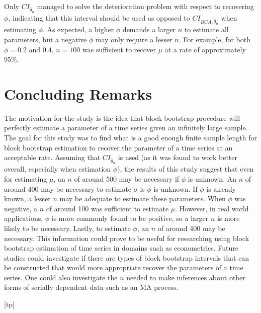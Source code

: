\documentclass[12pt, letterpaper, titlepage]{article}
\begin{document}
Only $CI_{\hat{\theta}_{n}}$ managed to solve the deterioration problem with respect to recovering $\phi$, indicating that this interval 
should be used as opposed to $CI_{BCA, \hat{\theta}_{n}}$ when estimating $\phi$. As expected, a higher $\phi$ demands a 
larger $n$ to estimate all parameters, but a negative $\phi$ may only require a lesser $n$. For example, for both $\phi = 0.2$ and $0.4$, 
$n = 100$ was sufficient to recover $\mu$ at a rate of approximately 95\%.

\section{Concluding Remarks}
\label{sec:conremarks}

The motivation for the study is the idea that block bootstrap procedure will perfectly estimate a parameter of a time series given 
an infinitely large sample. 
The goal for this study was to find what is a good enough finite sample length for block bootstrap estimation to recover 
the parameter of a 
time series at an acceptable rate. Assuming that $CI_{\hat{\theta}_{n}}$ is used (as it was found to work better overall, 
especially when estimation $\phi$), 
the results of this study suggest that even for estimating $\mu$, an $n$ of around 500 may be necessary if $\phi$ is unknown. 
An $n$ of around 400 may be necessary to estimate $\sigma$ is $\phi$ is unknown. If $\phi$ is already known, 
a lesser $n$ may be adequate to estimate these parameters. When $\phi$ was negative, 
a $n$ of around 100 was sufficient to estimate $\mu$. However, in real world applications, $\phi$ is more commonly found to be positive, 
so a larger $n$ is more likely to be necessary. Lastly, to estimate $\phi$, an $n$ of around 400 may be necessary. 
This information could prove to be useful for researching using block bootstrap estimation of time series in domains such as econometrics. 
Future studies could investigate if there are types of block bootstrap intervals that can be constructed that 
would more appropriate recover the parameters of a time series. One could also investigate the $n$ needed to 
make inferences about other forms of serially dependent data such as an MA process.



[tp]
\end{document}
